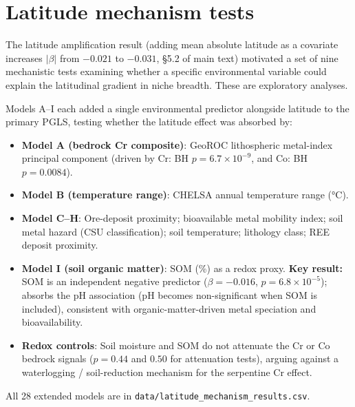 \documentclass[11pt]{article}
\begin{document}
\section{Latitude mechanism tests}
\label{sm:latitude}

The latitude amplification result (adding mean absolute latitude as a covariate
increases $|\beta|$ from $-0.021$ to $-0.031$, §5.2 of main text) motivated a
set of nine mechanistic tests examining whether a specific environmental
variable could explain the latitudinal gradient in niche breadth.  These are
exploratory analyses.

Models A--I each added a single environmental predictor alongside latitude to
the primary PGLS, testing whether the latitude effect was absorbed by:

\begin{itemize}
\item \textbf{Model A (bedrock Cr composite)}: GeoROC lithospheric
  metal-index principal component (driven by Cr: BH $p = 6.7 \times 10^{-9}$,
  and Co: BH $p = 0.0084$).

\item \textbf{Model B (temperature range)}: CHELSA annual temperature range
  (°C).

\item \textbf{Model C--H}: Ore-deposit proximity; bioavailable metal mobility
  index; soil metal hazard (CSU classification); soil temperature; lithology
  class; REE deposit proximity.

\item \textbf{Model I (soil organic matter)}: SOM (\%) as a redox proxy.
  \textbf{Key result:} SOM is an independent negative predictor
  ($\beta = -0.016$, $p = 6.8 \times 10^{-5}$); absorbs the pH association
  (pH becomes non-significant when SOM is included), consistent with
  organic-matter-driven metal speciation and bioavailability.

\item \textbf{Redox controls}: Soil moisture and SOM do not attenuate the
  Cr or Co bedrock signals ($p = 0.44$ and $0.50$ for attenuation tests),
  arguing against a waterlogging / soil-reduction mechanism for the serpentine
  Cr effect.
\end{itemize}

All 28 extended models are in \texttt{data/latitude\_mechanism\_results.csv}.
\end{document}
